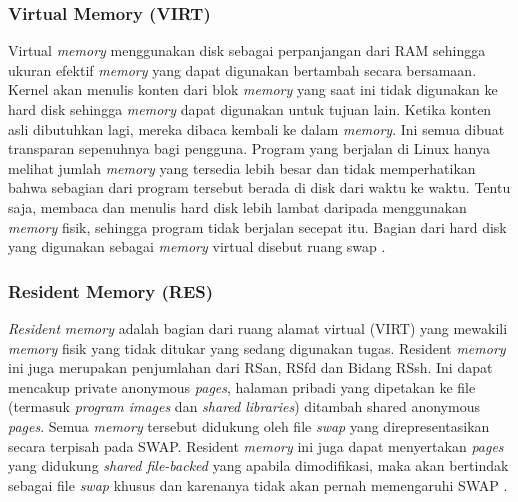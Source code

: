 
\subsubsection{Virtual Memory (VIRT)}
Virtual \textit{memory} menggunakan disk sebagai perpanjangan dari RAM sehingga ukuran efektif \textit{memory} yang dapat digunakan bertambah secara bersamaan. Kernel akan menulis konten dari blok \textit{memory} yang saat ini tidak digunakan ke hard disk sehingga \textit{memory} dapat digunakan untuk tujuan lain. Ketika konten asli dibutuhkan lagi, mereka dibaca kembali ke dalam \textit{memory}. Ini semua dibuat transparan sepenuhnya bagi pengguna. Program yang berjalan di Linux hanya melihat jumlah \textit{memory} yang tersedia lebih besar dan tidak memperhatikan bahwa sebagian dari program tersebut berada di disk dari waktu ke waktu. Tentu saja, membaca dan menulis hard disk lebih lambat daripada menggunakan \textit{memory} fisik, sehingga program tidak berjalan secepat itu. Bagian dari hard disk yang digunakan sebagai \textit{memory} virtual disebut ruang swap \cite{site:ltdp}.


\subsubsection{Resident Memory (RES)}

\textit{Resident} \textit{memory} adalah bagian dari ruang alamat virtual (VIRT) yang mewakili \textit{memory} fisik yang tidak ditukar yang sedang digunakan tugas. Resident \textit{memory} ini juga merupakan penjumlahan dari RSan, RSfd dan Bidang RSsh. Ini dapat mencakup private anonymous \textit{pages}, halaman pribadi yang dipetakan ke file (termasuk
\textit{program images} dan \textit{shared libraries}) ditambah shared anonymous \textit{pages}. Semua \textit{memory} tersebut didukung oleh file \textit{swap} yang direpresentasikan secara terpisah pada SWAP. Resident \textit{memory} ini juga dapat menyertakan \textit{pages} yang didukung \textit{shared file-backed} yang apabila dimodifikasi, maka akan bertindak sebagai file \textit{swap} khusus dan karenanya tidak akan pernah memengaruhi SWAP \cite{manual:linux}.

